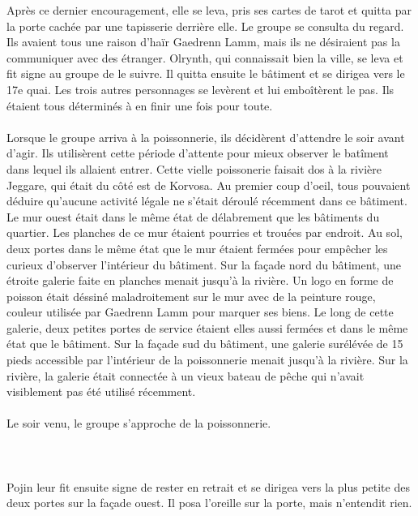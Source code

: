 \documentclass[main.tex]{subfiles}
\begin{document}
    Après ce dernier encouragement, elle se leva, pris ses cartes de tarot et quitta par la porte cachée par une tapisserie derrière elle.
    Le groupe se consulta du regard.
    Ils avaient tous une raison d'haïr Gaedrenn Lamm, mais ils ne désiraient pas la communiquer avec des étranger.
    Olrynth, qui connaissait bien la ville, se leva et fit signe au groupe de le suivre.
    Il quitta ensuite le bâtiment et se dirigea vers le 17e quai.
    Les trois autres personnages se levèrent et lui emboîtèrent le pas.
    Ils étaient tous déterminés à en finir une fois pour toute.\\
    \\
    Lorsque le groupe arriva à la poissonnerie, ils décidèrent d'attendre le soir avant d'agir.
    Ils utilisèrent cette période d'attente pour mieux observer le batîment dans lequel ils allaient entrer.
    Cette vielle poissonerie faisait dos à la rivière Jeggare, qui était du côté est de Korvosa.
    Au premier coup d'oeil, tous pouvaient déduire qu'aucune activité légale ne s'était déroulé récemment dans ce bâtiment.
    Le mur ouest était dans le même état de délabrement que les bâtiments du quartier.
    Les planches de ce mur étaient pourries et trouées par endroit.
    Au sol, deux portes dans le même état que le mur étaient fermées pour empêcher les curieux d'observer l'intérieur du bâtiment.
    Sur la façade nord du bâtiment, une étroite galerie faite en planches menait jusqu'à la rivière.
    Un logo en forme de poisson était déssiné maladroitement sur le mur avec de la peinture rouge, couleur utilisée par Gaedrenn Lamm pour marquer ses biens.
    Le long de cette galerie, deux petites portes de service étaient elles aussi fermées et dans le même état que le bâtiment.
    Sur la façade sud du bâtiment, une galerie surélévée de 15 pieds accessible par l'intérieur de la poissonnerie menait jusqu'à la rivière.
    Sur la rivière, la galerie était connectée à un vieux bateau de pêche qui n'avait visiblement pas été utilisé récemment.\\
    \\
    Le soir venu, le groupe s'approche de la poissonnerie.\\
    \\
    \\
    \\
    Pojin leur fit ensuite signe de rester en retrait et se dirigea vers la plus petite des deux portes sur la façade ouest.
    Il posa l'oreille sur la porte, mais n'entendit rien.
\end{document}
